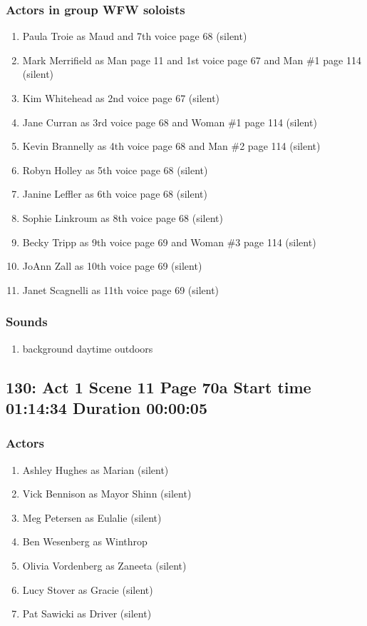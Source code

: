 \subsubsection{Actors in group WFW soloists}
\begin{enumerate}
\item Paula Troie as Maud and 7th voice page 68 (silent)
\item Mark Merrifield as Man page 11 and 1st voice page 67 and Man \#1 page 114 (silent)
\item Kim Whitehead as 2nd voice page 67 (silent)
\item Jane Curran as 3rd voice page 68 and Woman \#1 page 114 (silent)
\item Kevin Brannelly as 4th voice page 68 and Man \#2 page 114 (silent)
\item Robyn Holley as 5th voice page 68 (silent)
\item Janine Leffler as 6th voice page 68 (silent)
\item Sophie Linkroum as 8th voice page 68 (silent)
\item Becky Tripp as 9th voice page 69 and Woman \#3 page 114 (silent)
\item JoAnn Zall as 10th voice page 69 (silent)
\item Janet Scagnelli as 11th voice page 69 (silent)
\end{enumerate}

\subsubsection{Sounds}
\begin{enumerate}
\item background daytime outdoors
\end{enumerate}
\subsection{130: Act 1 Scene 11 Page 70a Start time 01:14:34 Duration 00:00:05}

\subsubsection{Actors}
\begin{enumerate}
\item Ashley Hughes as Marian (silent)
\item Vick Bennison as Mayor Shinn (silent)
\item Meg Petersen as Eulalie (silent)
\item Ben Wesenberg as Winthrop
\item Olivia Vordenberg as Zaneeta (silent)
\item Lucy Stover as Gracie (silent)
\item Pat Sawicki as Driver (silent)
\end{enumerate}
